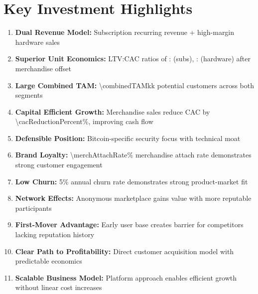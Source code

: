 
\section{Key Investment Highlights}

\begin{enumerate}
  \item \textbf{Dual Revenue Model:} Subscription recurring revenue + high-margin hardware sales
  \item \textbf{Superior Unit Economics:} LTV:CAC ratios of \numint{\subLTV/(\cacDigital - \merchOffsetSubsCalc)}: (subs), \numint{\hwWeightedAvgGP/(\cacEvents - \merchOffsetHwCalc)}: (hardware) after merchandise offset
  \item \textbf{Large Combined TAM:} \num{\combinedTAMk}k potential customers across both segments
  \item \textbf{Capital Efficient Growth:} Merchandise sales reduce CAC by \num{\cacReductionPercent}\%, improving cash flow
  \item \textbf{Defensible Position:} Bitcoin-specific security focus with technical moat
  \item \textbf{Brand Loyalty:} \num{\merchAttachRate}\% merchandise attach rate demonstrates strong customer engagement
  \item \textbf{Low Churn:} \num{5}\% annual churn rate demonstrates strong product-market fit
  \item \textbf{Network Effects:} Anonymous marketplace gains value with more reputable participants
  \item \textbf{First-Mover Advantage:} Early user base creates barrier for competitors lacking reputation history
  \item \textbf{Clear Path to Profitability:} Direct customer acquisition model with predictable economics
  \item \textbf{Scalable Business Model:} Platform approach enables efficient growth without linear cost increases
\end{enumerate}
